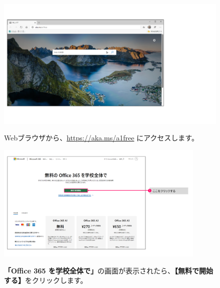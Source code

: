 \begin{figure}[h]
    \begin{minipage}{0.6\textwidth}
        \includegraphics[width=12cm]{figures/O365A1_submission00.png}
    \end{minipage}
    \begin{minipage}{0.4\textwidth}
        Webブラウザから、\url{https://aka.ms/a1free} にアクセスします。
    \end{minipage}
\end{figure}


\begin{figure}[h]
    \begin{minipage}{0.6\textwidth}
        \includegraphics[width=10cm]{figures/O365A1_submission01.png}
    \end{minipage}
    \begin{minipage}{0.4\textwidth}
        \textbf{「Office 365 を学校全体で」}の画面が表示されたら、\textbf{【無料で開始する】}をクリックします。
    \end{minipage}
\end{figure}

